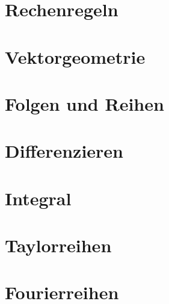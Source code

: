 



\maketitle



\tableofcontents

\chapter{Rechenregeln}



\chapter{Vektorgeometrie}


\chapter{Folgen und Reihen}



\chapter{Differenzieren}




\chapter{Integral}




\chapter{Taylorreihen}


\chapter{Fourierreihen}


